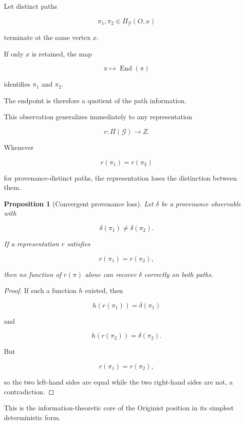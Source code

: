 \documentclass[
  11pt,
  a4paper,
  DIV=12,
  BCOR=0mm,
  parskip=half-
]{scrartcl}
\newcommand{\graphG}{\mathcal G}
\newcommand{\End}{\operatorname{End}}
\theoremstyle{definition}
\theoremstyle{plain}
\newtheorem{proposition}[definition]{Proposition}
\theoremstyle{remark}
\begin{document}
Let distinct paths

\[
  \pi_1,\pi_2\in\Pi_{\graphG}(O,x)
\]

terminate at the same vertex \(x\).

If only \(x\) is retained, the map

\[
  \pi\mapsto\End(\pi)
\]

identifies \(\pi_1\) and \(\pi_2\).

The endpoint is therefore a quotient of the path information.

This observation generalizes immediately to any representation

\[
  r:\Pi(\graphG)\to Z.
\]

Whenever

\[
  r(\pi_1)=r(\pi_2)
\]

for provenance-distinct paths, the representation loses the distinction
between them.

\begin{proposition}[Convergent provenance loss]
\label{prop:convergent-provenance-loss}
Let \(\delta\) be a provenance observable with

\[
  \delta(\pi_1)\neq\delta(\pi_2).
\]

If a representation \(r\) satisfies

\[
  r(\pi_1)=r(\pi_2),
\]

then no function of \(r(\pi)\) alone can recover \(\delta\) correctly on both
paths.
\end{proposition}

\begin{proof}
If such a function \(h\) existed, then

\[
  h(r(\pi_1))
  =
  \delta(\pi_1)
\]

and

\[
  h(r(\pi_2))
  =
  \delta(\pi_2).
\]

But

\[
  r(\pi_1)=r(\pi_2),
\]

so the two left-hand sides are equal while the two right-hand sides are not,
a contradiction.
\end{proof}

This is the information-theoretic core of the Originist position in its
simplest deterministic form.

\end{document}
